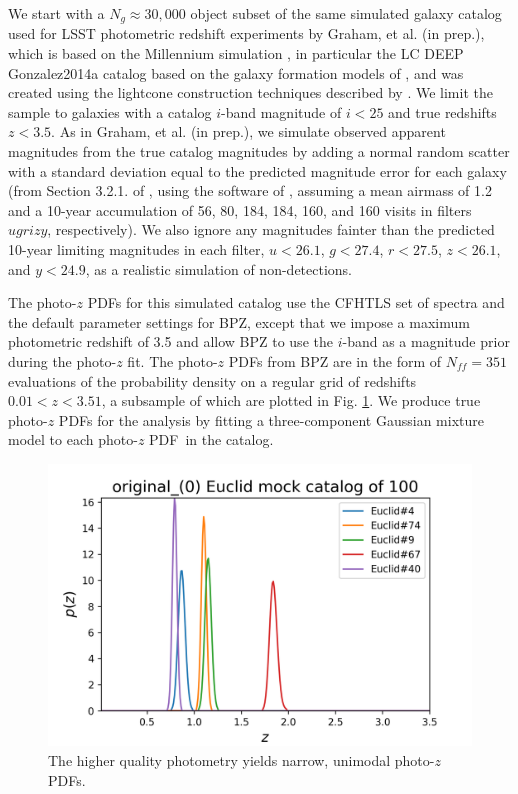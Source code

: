 \documentclass[\docopts]{\docclass}
\newcommand{\pz}{photo-$z$ PDF}
\begin{document}
We start with a $N_{g}\approx30,000$ object subset of the same simulated galaxy 
catalog used for LSST photometric redshift experiments by Graham, et al. (in 
prep.), which is based on the Millennium simulation 
\citep{springel_simulations_2005}, in particular the LC DEEP Gonzalez2014a
catalog based on the galaxy formation models of \cite{gonzalez-perez_how_2014}, 
and was created using the lightcone construction techniques described by 
\cite{merson_lightcone_2013}.  We limit the sample to galaxies with a catalog 
$i$-band magnitude of $i<25$ and true redshifts $z<3.5$. As in Graham, et al. 
(in prep.), we simulate observed apparent magnitudes from the true catalog 
magnitudes by adding a normal random scatter with a standard deviation equal to 
the predicted magnitude error for each galaxy (from Section 3.2.1. of 
\citealt{ivezic_lsst:_2008}, using the software of 
\citealt{connolly_end--end_2014}, assuming a mean airmass of 1.2 and a 10-year 
accumulation of 56, 80, 184, 184, 160, and 160 visits in filters $ugrizy$, 
respectively).  We also ignore any magnitudes fainter than the predicted 
10-year limiting magnitudes in each filter, $u<26.1$, $g<27.4$, $r<27.5$, 
$z<26.1$, and $y<24.9$, as a realistic simulation of non-detections.

The \pz s for this simulated catalog use the CFHTLS set of spectra 
\citep{ilbert_accurate_2006} and the default parameter settings for BPZ, except 
that we impose a maximum photometric redshift of 3.5 and allow BPZ to use the 
$i$-band as a magnitude prior during the photo-$z$ fit. The \pz s from BPZ are 
in the form of $N_{ff} = 351$ evaluations of the probability density on a 
regular grid of redshifts $0.01 < z < 3.51$, a subsample of which are plotted 
in Fig. \ref{fig:euclid_pzs}.  We produce true \pz s for the analysis by 
fitting a three-component Gaussian mixture model to each \pz\ in the catalog.

\begin{figure}
  \includegraphics[width=0.9\columnwidth]{figures/euclid_pzs.png}
  \caption{The higher quality photometry yields narrow, unimodal \pz s.
  \label{fig:euclid_pzs}}
\end{figure}
\end{document}
